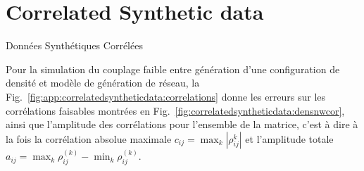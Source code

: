 
\newpage

\section{Correlated Synthetic data}{Données Synthétiques Corrélées}

\label{app:sec:correlatedsyntheticdata}


Pour la simulation du couplage faible entre génération d'une configuration de densité et modèle de génération de réseau, la Fig.~\ref{fig:app:correlatedsyntheticdata:correlations} donne les erreurs sur les corrélations faisables montrées en Fig.~\ref{fig:correlatedsyntheticdata:densnwcor}, ainsi que l'amplitude des corrélations pour l'ensemble de la matrice, c'est à dire à la fois la corrélation absolue maximale $c_{ij}=\max_k\left| \rho_{ij}^{k} \right|$ et l'amplitude totale $a_{ij}=\max_k{\rho_{ij}^{(k)}}-\min_k{\rho_{ij}^{(k)}}$.



